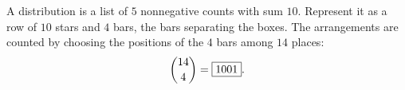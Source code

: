 A distribution is a list of $5$ nonnegative counts with sum $10$. Represent it as a row of $10$ stars and $4$ bars, the bars separating the boxes. The arrangements are counted by choosing the positions of the $4$ bars among $14$ places:
\[\dbinom{14}{4}=\boxed{1001}.\]
